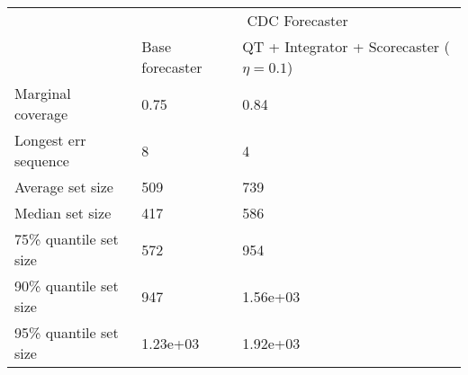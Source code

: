 \begin{tabular}{lll}
\toprule
& \multicolumn{2}{c}{CDC Forecaster} \\
& Base forecaster & QT + Integrator + Scorecaster ($\eta=0.1$) \\
\midrule
Marginal coverage & 0.75 & 0.84 \\
Longest err sequence & 8 & 4 \\
Average set size & 509 & 739 \\
Median set size & 417 & 586 \\
75\% quantile set size & 572 & 954 \\
90\% quantile set size & 947 & 1.56e+03 \\
95\% quantile set size & 1.23e+03 & 1.92e+03 \\
\bottomrule
\end{tabular}
